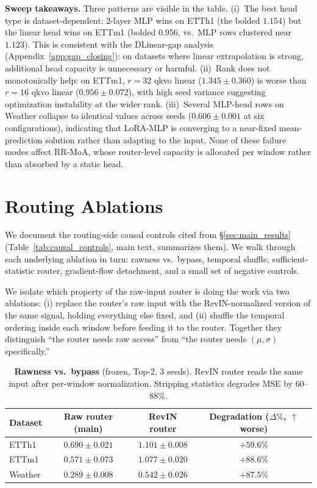 \documentclass{article}
\begin{document}
\textbf{Sweep takeaways.} Three patterns are visible in the table. (i)~The best head type is dataset-dependent: 2-layer MLP wins on ETTh1 (the bolded $1.154$) but the linear head wins on ETTm1 (bolded $0.956$, vs.\ MLP rows clustered near $1.123$). This is consistent with the DLinear-gap analysis (Appendix~\ref{app:gap_closing}): on datasets where linear extrapolation is strong, additional head capacity is unnecessary or harmful. (ii)~Rank does not monotonically help: on ETTm1, $r{=}32$ qkvo linear ($1.345 \pm 0.360$) is worse than $r{=}16$ qkvo linear ($0.956 \pm 0.072$), with high seed variance suggesting optimization instability at the wider rank. (iii)~Several MLP-head rows on Weather collapse to identical values across seeds ($0.606 \pm 0.001$ at six configurations), indicating that LoRA-MLP is converging to a near-fixed mean-prediction solution rather than adapting to the input. None of these failure modes affect RR-MoA, whose router-level capacity is allocated per window rather than absorbed by a static head.

\section{Routing Ablations}
\label{app:routing_ablations}

We document the routing-side causal controls cited from \S\ref{sec:main_results} (Table~\ref{tab:causal_controls}, main text, summarizes them). We walk through each underlying ablation in turn: rawness vs.\ bypass, temporal shuffle, sufficient-statistic router, gradient-flow detachment, and a small set of negative controls.

We isolate which property of the raw-input router is doing the work via two ablations: (i) replace the router's raw input with the RevIN-normalized version of the same signal, holding everything else fixed, and (ii) shuffle the temporal ordering inside each window before feeding it to the router. Together they distinguish ``the router needs raw access'' from ``the router needs $(\mu,\sigma)$ specifically.''

\begin{table}[!htbp]
\centering
\caption{\textbf{Rawness vs.\ bypass} (frozen, Top-2, 3 seeds). RevIN router reads the same input after per-window normalization. Stripping statistics degrades MSE by 60--88\%.}
\label{tab:router_input}
\small
\begin{tabular}{@{}lccc@{}}
\toprule
Dataset & Raw router (main) & RevIN router & Degradation ($\Delta\%$, $\uparrow$ worse) \\
\midrule
ETTh1   & $\mathbf{0.690 \pm 0.021}$ & $1.101 \pm 0.008$ & $\mathbf{+59.6\%}$ \\
ETTm1   & $\mathbf{0.571 \pm 0.073}$ & $1.077 \pm 0.020$ & $\mathbf{+88.6\%}$ \\
Weather & $\mathbf{0.289 \pm 0.008}$ & $0.542 \pm 0.026$ & $\mathbf{+87.5\%}$ \\
\bottomrule
\end{tabular}
\end{table}
\end{document}
